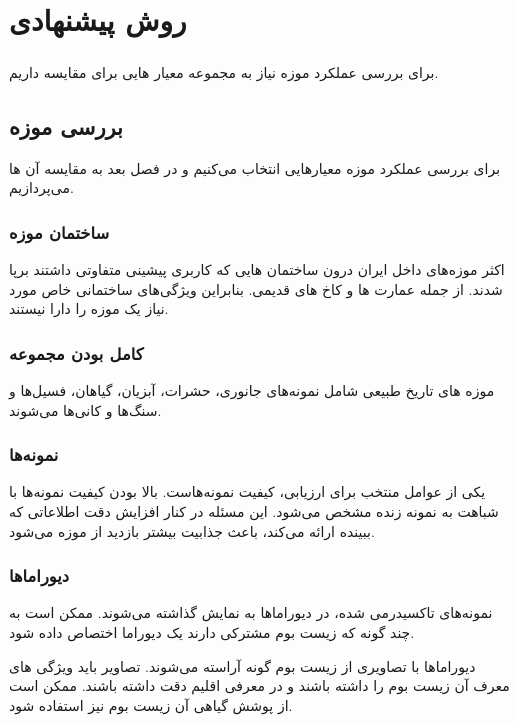 
\chapter{روش پیشنهادی} \label{chapter:proposed-method}

\paragraph*{}
برای بررسی عملکرد موزه نیاز به مجموعه معیار هایی برای مقایسه داریم.


\section{بررسی موزه}
برای بررسی عملکرد موزه معیارهایی انتخاب می‌کنیم و در فصل بعد به مقایسه آن ها می‌پردازیم.

\subsection{ساختمان موزه}
اکثر موزه‌های داخل ایران درون ساختمان هایی که کاربری پیشینی متفاوتی داشتند برپا شدند. از جمله عمارت ها و کاخ های قدیمی.
بنابراین ویژگی‌های ساختمانی خاص مورد نیاز یک موزه را دارا نیستند.


\subsection{کامل بودن مجموعه}
موزه های تاریخ طبیعی شامل نمونه‌های جانوری، حشرات، آبزیان، گیاهان، فسیل‌ها و سنگ‌ها و کانی‌ها می‌شوند.


\subsection{نمونه‌ها}
یکی از عوامل منتخب برای ارزیابی، کیفیت نمونه‌هاست. بالا بودن کیفیت نمونه‌ها با شباهت به نمونه زنده مشخص می‌شود. این مسئله در کنار افزایش دقت اطلاعاتی که ببینده ارائه می‌کند، باعث جذابیت بیشتر بازدید از موزه می‌شود. 


\subsection{دیوراماها}
نمونه‌های تاکسیدرمی شده، در دیوراماها به نمایش گذاشته می‌شوند. ممکن است به چند گونه که زیست بوم مشترکی دارند یک دیوراما اختصاص داده شود.

دیوراماها با تصاویری از زیست بوم گونه آراسته می‌شوند. تصاویر باید ویژگی های معرف آن زیست بوم را داشته باشند و در معرفی اقلیم دقت داشته باشند. ممکن است از پوشش گیاهی آن زیست بوم نیز استفاده شود.

